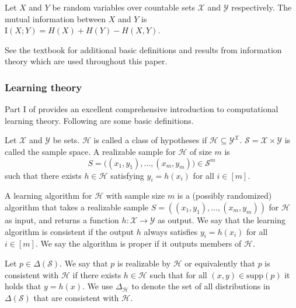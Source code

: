 \documentclass[final,12pt]{colt2018}
\newcommand{\mc}[1]{\mathcal{#1}}
\newcommand{\cH}{\mc{H}}
\newcommand{\cX}{\mc{X}}
\newcommand{\cY}{\mc{Y}}
\newcommand{\cS}{\mc{S}}
\newcommand{\II}[1]{\mathrm{I}\left(#1\right)}
\newcommand{\supp}{\mathrm{supp}}
\begin{document}
\begin{definition}
	Let $X$ and $Y$ be random variables over countable sets $\cX$ and $\cY$ respectively. The mutual information between $X$ and $Y$ is $\II{X;Y} = H(X)+H(Y)-H(X,Y)$.
\end{definition}


See the textbook \cite{cover2012elements} for additional basic definitions and results from information theory which are used throughout this paper.

\subsubsection*{Learning theory}

Part I of \cite{shalev2014understanding} provides an excellent comprehensive introduction to computational learning theory. Following are some basic definitions. %

\begin{definition}
	Let $\cX$ and $\cY$ be sets. $\cH$ is called {a class of hypotheses} if $\cH \subseteq \cY^\cX$.
%
%
	$\cS = \cX \times \cY$ is called the {sample space}.
%
	A {realizable sample for $\cH$ of size $m$} is 
	\[
	S = \big((x_1,y_1), \dots, (x_m,y_m) \big) \in \cS^m
	\]
	such that there exists $h \in \cH$ satisfying $y_i=h(x_i)$ for all $i \in [m]$.
\end{definition}

\begin{definition}\label{def_learning_algo}
	A {learning algorithm for $\cH$ with sample size $m$} is a (possibly randomized) algorithm that takes a realizable sample $S = ((x_1,y_1), \dots, (x_m,y_m))$ for $\cH$ as input, and returns a function $h:\cX\rightarrow \cY$ as output. We say that the learning algorithm is {consistent} if the output $h$ always satisfies $y_i=h(x_i)$ for all $i \in [m]$. We say the algorithm is { proper } if it outputs members of $\cH$.
\end{definition}


\begin{definition}
	Let $p \in \Delta(\cS)$. We say that {$p$ is realizable by $\cH$} or equivalently that {$p$ is consistent with $\cH$} if there exists $h\in\cH$ such that for all $(x,y)\in \supp(p)$ it holds that $y=h(x)$.
	We use $\Delta_{\cH}$ to denote the set of all distributions in $\Delta(\cS)$ that are consistent with $\cH$.
\end{definition}
\end{document}
